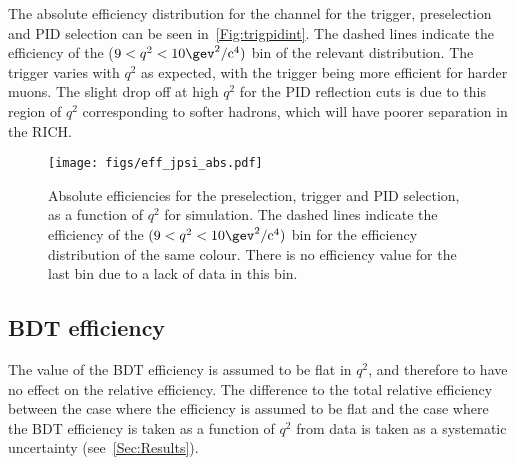 

The absolute efficiency distribution for the \Lbpi channel for the trigger, preselection and PID selection can be seen in~\autoref{Fig:trigpidint}. The dashed lines indicate the efficiency of the ($9<q^{2}<10 \gev^{2}/\mathrm{c}^{4})$ bin of the relevant distribution. The trigger varies with $q^{2}$ as expected, with the trigger being more efficient for harder muons. The slight drop off at high $q^{2}$ for the PID reflection cuts is due to this region of $q^{2}$ corresponding to softer hadrons, which will have poorer separation in the RICH. %

\begin{figure}[h]
  \centering
  \texttt{[image: figs/eff\_jpsi\_abs.pdf]}
  \caption{Absolute efficiencies for the preselection, trigger and PID selection,  as a function of $q^{2}$ for \Lbpi simulation. The dashed lines indicate the efficiency of the $(9<q^{2}<10\gev^{2}/\mathrm{c}^{4})$ bin for the efficiency distribution of the same colour. There is no efficiency value for the last bin due to a lack of data in this bin.}
  \label{Fig:trigpidint}
\end{figure}


\subsection{BDT efficiency}
The value of the BDT efficiency is assumed to be flat in $q^{2}$, and therefore to have no effect on the relative efficiency. The difference to the total relative efficiency between the case where the efficiency is  assumed to be flat and the case where the BDT efficiency is taken as a function of $q^{2}$ from \LbK data is taken as a systematic uncertainty (see~\autoref{Sec:Results}).  %


